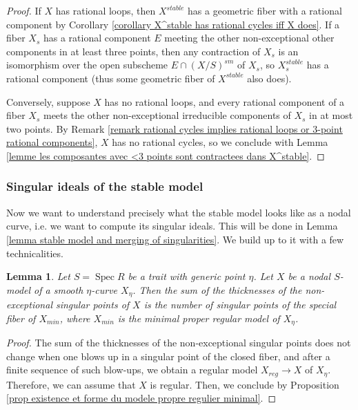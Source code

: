 \documentclass[a4paper,10pt,twoside]{article}
\newcommand{\ra}{\rightarrow}
\DeclareMathOperator{\spec}{Spec}
\newtheorem{lem}[thm]{Lemma}
\theoremstyle{definition}
\theoremstyle{remark}
\begin{document}
\begin{proof}
If $X$ has rational loops, then $X^{stable}$ has a geometric fiber with a rational component by Corollary \ref{corollary X^stable has rational cycles iff X does}. If a fiber $X_s$ has a rational component $E$ meeting the other non-exceptional other components in at least three points, then any contraction of $X_s$ is an isomorphism over the open subscheme $E\cap (X/S)^{sm}$ of $X_s$, so $X^{stable}_s$ has a rational component (thus some geometric fiber of $X^{stable}$ also does).

Conversely, suppose $X$ has no rational loops, and every rational component of a fiber $X_s$ meets the other non-exceptional irreducible components of $X_s$ in at most two points. By Remark \ref{remark rational cycles implies rational loops or 3-point rational components}, $X$ has no rational cycles, so we conclude with Lemma \ref{lemme les composantes avec <3 points sont contractees dans X^stable}.
\end{proof}


\subsubsection{Singular ideals of the stable model}
Now we want to understand precisely what the stable model looks like as a nodal curve, i.e. we want to compute its singular ideals. This will be done in Lemma \ref{lemma stable model and merging of singularities}. We build up to it with a few technicalities.


\begin{lem}\label{lemma invariance of the sum of thicknesses of non exceptional points over a dvr}
Let $S=\spec R$ be a trait with generic point $\eta$. Let $X$ be a nodal $S$-model of a smooth $\eta$-curve $X_\eta$. Then the sum of the thicknesses of the non-exceptional singular points of $X$ is the number of singular points of the special fiber of $X_{min}$, where $X_{min}$ is the minimal proper regular model of $X_\eta$.
\end{lem}

\begin{proof}
The sum of the thicknesses of the non-exceptional singular points does not change when one blows up in a singular point of the closed fiber, and after a finite sequence of such blow-ups, we obtain a regular model $X_{reg}\ra X$ of $X_\eta$. Therefore, we can assume that $X$ is regular. Then, we conclude by Proposition \ref{prop existence et forme du modele propre regulier minimal}.
\end{proof}
\end{document}
